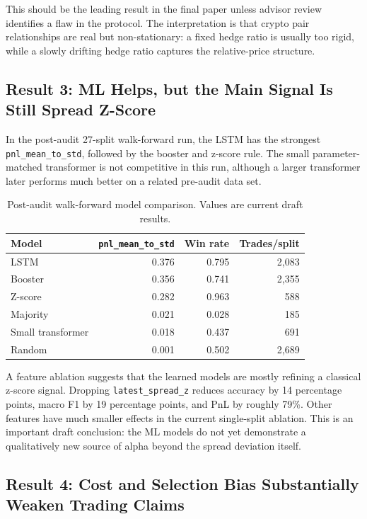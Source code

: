 \documentclass[11pt]{article}
\begin{document}
This should be the leading result in the final paper unless advisor review
identifies a flaw in the protocol. The interpretation is that crypto pair
relationships are real but non-stationary: a fixed hedge ratio is usually too
rigid, while a slowly drifting hedge ratio captures the relative-price
structure.

\subsection{Result 3: ML Helps, but the Main Signal Is Still Spread Z-Score}

In the post-audit 27-split walk-forward run, the LSTM has the strongest
\texttt{pnl\_mean\_to\_std}, followed by the booster and z-score rule. The
small parameter-matched transformer is not competitive in this run, although a
larger transformer later performs much better on a related pre-audit data set.

\begin{table}[h]
\centering
\caption{Post-audit walk-forward model comparison. Values are current draft results.}
\begin{tabular}{lrrr}
\toprule
Model & \texttt{pnl\_mean\_to\_std} & Win rate & Trades/split \\
\midrule
LSTM & 0.376 & 0.795 & 2,083 \\
Booster & 0.356 & 0.741 & 2,355 \\
Z-score & 0.282 & 0.963 & 588 \\
Majority & 0.021 & 0.028 & 185 \\
Small transformer & 0.018 & 0.437 & 691 \\
Random & 0.001 & 0.502 & 2,689 \\
\bottomrule
\end{tabular}
\end{table}

A feature ablation suggests that the learned models are mostly refining a
classical z-score signal. Dropping \texttt{latest\_spread\_z} reduces accuracy
by 14 percentage points, macro F1 by 19 percentage points, and PnL by roughly
79\%. Other features have much smaller effects in the current single-split
ablation. This is an important draft conclusion: the ML models do not yet
demonstrate a qualitatively new source of alpha beyond the spread deviation
itself.

\subsection{Result 4: Cost and Selection Bias Substantially Weaken Trading Claims}
\end{document}
